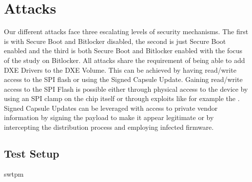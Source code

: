 
\chapter{Attacks}
Our different attacks face three escalating levels of security mechanisms. The first is with Secure Boot and Bitlocker disabled, the second is just Secure Boot enabled and the third is both Secure Boot and Bitlocker enabled with the focus of the study on Bitlocker.
All attacks share the requirement of being able to add DXE Drivers to the DXE Volume.
This can be achieved by having read/write access to the SPI flash or using the Signed Capsule Update. Gaining read/write access to the SPI Flash is possible either through physical access to the device by using an SPI clamp on the chip itself or through exploits like for example the
. Signed Capsule Updates can be leveraged with access to private vendor information by signing the payload to make it appear legitimate or by intercepting the distribution process and employing infected firmware.

\section{Test Setup}
swtpm



